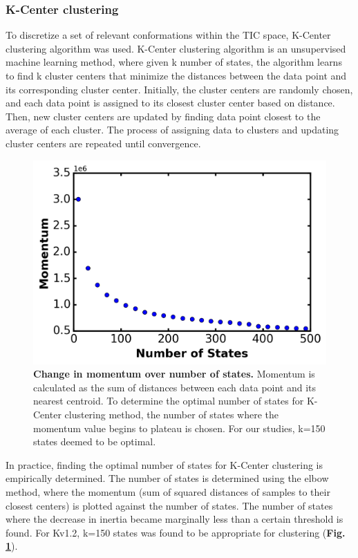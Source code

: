 \subsubsection{K-Center clustering}
To discretize a set of relevant conformations within the TIC space, K-Center clustering algorithm was used. K-Center clustering algorithm is an unsupervised machine learning method, where given k number of states, the algorithm learns to find k cluster centers that minimize the distances between the data point and its corresponding cluster center. Initially, the cluster centers are randomly chosen, and each data point is assigned to its closest cluster center based on distance. Then, new cluster centers are updated by finding data point closest to the average of each cluster. The process of assigning data to clusters and updating cluster centers are repeated until convergence.

\begin{figure}[!ht]
\begin{center}
	\includegraphics[width=13cm]{figures/chapter2/Fig2-2_momentum.png}
\end{center}
	\caption{\textbf{Change in momentum over number of states.} Momentum is calculated as the sum of distances between each data point and its nearest centroid. To determine the optimal number of states for K-Center clustering method, the number of states where the momentum value begins to plateau is chosen. For our studies, k=150 states deemed to be optimal.}
	\label{fig:ch2_f2}
\end{figure}

In practice, finding the optimal number of states for K-Center clustering is empirically determined. The number of states is determined using the elbow method, where the momentum (sum of squared distances of samples to their closest centers) is plotted against the number of states. The number of states where the decrease in inertia became marginally less than a certain threshold is found. For Kv1.2, k=150 states was found to be appropriate for clustering (\textbf{Fig. \ref{fig:ch2_f2}}).

